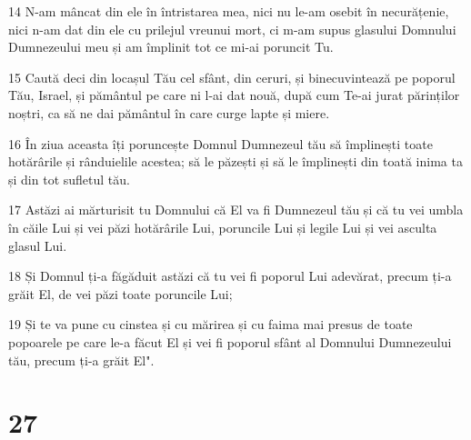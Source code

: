 \par 14 N-am mâncat din ele în întristarea mea, nici nu le-am osebit în necurățenie, nici n-am dat din ele cu prilejul vreunui mort, ci m-am supus glasului Domnului Dumnezeului meu și am împlinit tot ce mi-ai poruncit Tu.
\par 15 Caută deci din locașul Tău cel sfânt, din ceruri, și binecuvintează pe poporul Tău, Israel, și pământul pe care ni l-ai dat nouă, după cum Te-ai jurat părinților noștri, ca să ne dai pământul în care curge lapte și miere.
\par 16 În ziua aceasta îți poruncește Domnul Dumnezeul tău să împlinești toate hotărârile și rânduielile acestea; să le păzești și să le împlinești din toată inima ta și din tot sufletul tău.
\par 17 Astăzi ai mărturisit tu Domnului că El va fi Dumnezeul tău și că tu vei umbla în căile Lui și vei păzi hotărârile Lui, poruncile Lui și legile Lui și vei asculta glasul Lui.
\par 18 Și Domnul ți-a făgăduit astăzi că tu vei fi poporul Lui adevărat, precum ți-a grăit El, de vei păzi toate poruncile Lui;
\par 19 Și te va pune cu cinstea și cu mărirea și cu faima mai presus de toate popoarele pe care le-a făcut El și vei fi poporul sfânt al Domnului Dumnezeului tău, precum ți-a grăit El".

\chapter{27}

